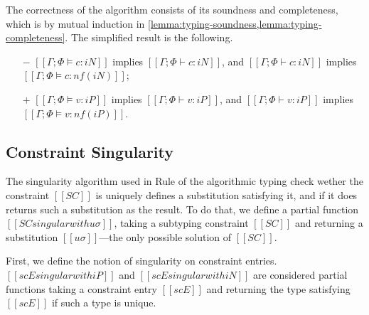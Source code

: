 \documentclass[a4,natbib=false]{article}
\newcommand{\ruleref}[1]{Rule \nameref{#1}}
\begin{document}
The correctness of the algorithm consists of its soundness and 
completeness, which is by mutual
induction in \cref{lemma:typing-soundness,lemma:typing-completeness}.
The simplified result is the following.
\begin{theorempreview}
  \hfill
  \begin{itemize}
    \item [$-$] $[[Γ; Φ ⊨ c : iN]]$ implies $[[Γ; Φ ⊢ c : iN]]$, 
      and $[[Γ; Φ ⊢ c : iN]]$ implies $[[Γ; Φ ⊨ c : nf(iN)]]$;
    \item [$+$] $[[Γ; Φ ⊨ v : iP]]$ implies $[[Γ; Φ ⊢ v : iP]]$, 
      and $[[Γ; Φ ⊢ v : iP]]$ implies $[[Γ; Φ ⊨ v : nf(iP)]]$.
  \end{itemize}
\end{theorempreview}


\subsection{Constraint Singularity}
\label{sec:constraint-singularity}

The singularity algorithm used in  \ruleref{\ottdruleATAppLetAnnLabel}
of the algorithmic typing check wether the constraint $[[SC]]$
is uniquely defines a substitution satisfying it, and if it does
returns such a substitution as the result.
To do that, we define a partial function $[[SC singular with uσ]]$,
taking a subtyping constraint $[[SC]]$ and returning a substitution 
$[[uσ]]$---the only possible solution of $[[SC]]$. 

First, we define the notion of singularity on constraint entries. 
$[[scE singular with iP]]$ and $[[scE singular with iN]]$
are considered partial functions taking a constraint entry $[[scE]]$
and returning the type satisfying $[[scE]]$ if such a type is unique. 

\begin{algorithm}
  \hfill
  \begin{multicols}{2}
    \ottdefnSINGscEN{}
    
    \columnbreak
    \ottdefnSINGscEP{}
  \end{multicols}
\end{algorithm}
\end{document}
